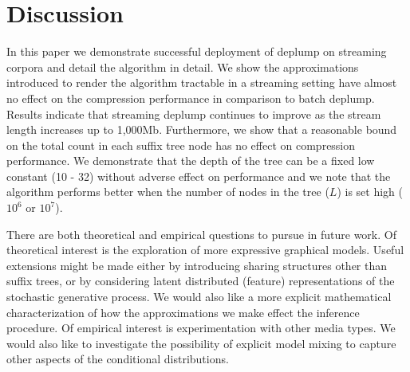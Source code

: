 \section{Discussion}
\label{sec:discussion}

In this paper we demonstrate successful deployment of deplump on streaming corpora and detail the algorithm in detail.  We show the approximations introduced to render the algorithm tractable in a streaming setting have almost no effect on the compression performance in comparison to batch deplump.  Results indicate that streaming deplump continues to improve as the stream length increases up to 1,000Mb.  Furthermore, we show that a reasonable bound on the total count in each suffix tree node has no effect on compression performance. We demonstrate that the depth of the tree can be a fixed low constant (10 - 32) without adverse effect on performance and we note that the algorithm performs better when the number of nodes in the tree ($L$) is set high ($10^6$ or $10^7$).

There are both theoretical and empirical questions to pursue in future work.  Of theoretical interest is the exploration of more expressive graphical models. Useful extensions might be made either by introducing sharing structures other than suffix trees, or by considering latent distributed (feature) representations of the stochastic generative process.  We would also like a more explicit mathematical characterization of how the approximations we make effect the inference procedure.  Of empirical interest is experimentation with other media types.  We would also like to investigate the possibility of explicit model mixing to capture other aspects of the conditional distributions.  
